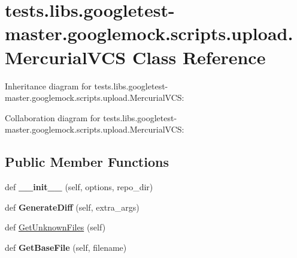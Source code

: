 \hypertarget{classtests_1_1libs_1_1googletest-master_1_1googlemock_1_1scripts_1_1upload_1_1MercurialVCS}{}\section{tests.\+libs.\+googletest-\/master.googlemock.\+scripts.\+upload.\+Mercurial\+V\+CS Class Reference}
\label{classtests_1_1libs_1_1googletest-master_1_1googlemock_1_1scripts_1_1upload_1_1MercurialVCS}


Inheritance diagram for tests.\+libs.\+googletest-\/master.googlemock.\+scripts.\+upload.\+Mercurial\+V\+CS\+:


Collaboration diagram for tests.\+libs.\+googletest-\/master.googlemock.\+scripts.\+upload.\+Mercurial\+V\+CS\+:
\subsection*{Public Member Functions}
\begin{DoxyCompactItemize}
\item 
\mbox{\label{classtests_1_1libs_1_1googletest-master_1_1googlemock_1_1scripts_1_1upload_1_1MercurialVCS_a975325d0b1bd8362dad1f53b821ccdc6}} 
def {\bfseries \+\_\+\+\_\+init\+\_\+\+\_\+} (self, options, repo\+\_\+dir)
\item 
\mbox{\label{classtests_1_1libs_1_1googletest-master_1_1googlemock_1_1scripts_1_1upload_1_1MercurialVCS_a37735cad420c1d52327abad98b76de58}} 
def {\bfseries Generate\+Diff} (self, extra\+\_\+args)
\item 
def \hyperlink{classtests_1_1libs_1_1googletest-master_1_1googlemock_1_1scripts_1_1upload_1_1MercurialVCS_a5154c7c4a362d4651f04ffc731e43ed1}{Get\+Unknown\+Files} (self)
\item 
\mbox{\label{classtests_1_1libs_1_1googletest-master_1_1googlemock_1_1scripts_1_1upload_1_1MercurialVCS_ac4be4ac75092ab0be495d404447e6a98}} 
def {\bfseries Get\+Base\+File} (self, filename)
\end{DoxyCompactItemize}

